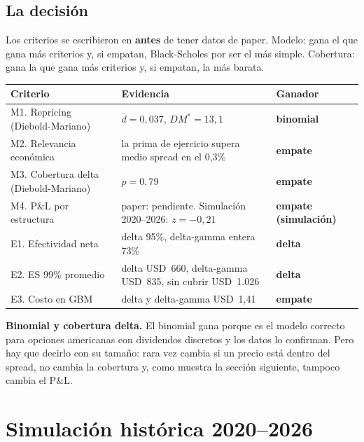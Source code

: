 \documentclass[11pt,a4paper]{article}
\newcommand{\code}[1]{\texttt{\detokenize{#1}}}
\newcommand{\usd}[1]{USD~#1}
\begin{document}
\subsection{La decisión}

Los criterios se escribieron en \code{scripts/scorecard.py} \textbf{antes} de tener datos de paper. Modelo: gana el
que gana más criterios y, si empatan, Black-Scholes por ser el más simple. Cobertura: gana la que gana más
criterios y, si empatan, la más barata.

\begin{center}
\small
\begin{tabularx}{\linewidth}{@{}>{\sffamily}lX>{\sffamily\bfseries}l@{}}
\toprule
\textbf{Criterio} & \textbf{Evidencia} & \textbf{Ganador} \\
\midrule
M1. Repricing (Diebold-Mariano) & $\bar d = 0{,}037$, $DM^* = 13{,}1$ & \textcolor{crr}{binomial} \\
M2. Relevancia económica & la prima de ejercicio supera medio spread en el 0,3\% & empate \\
M3. Cobertura delta (Diebold-Mariano) & $p = 0{,}79$ & empate \\
M4. P\&L por estructura & paper: pendiente. Simulación 2020–2026: $z=-0{,}21$ & empate (simulación) \\
\midrule
E1. Efectividad neta & delta 95\%, delta-gamma entera 73\% & \textcolor{aqua!70!black}{delta} \\
E2. ES 99\% promedio & delta \usd{660}, delta-gamma \usd{835}, sin cubrir \usd{1.026} & \textcolor{aqua!70!black}{delta} \\
E3. Costo en GBM & delta y delta-gamma \usd{1,41} & empate \\
\bottomrule
\end{tabularx}
\end{center}

\begin{idea}[Resultado]
\textbf{Binomial y cobertura delta.} El binomial gana porque es el modelo correcto para opciones americanas con
dividendos discretos y los datos lo confirman. Pero hay que decirlo con su tamaño: rara vez cambia si un precio está
dentro del spread, no cambia la cobertura y, como muestra la sección siguiente, tampoco cambia el P\&L.
\end{idea}

\newpage
\section{Simulación histórica 2020–2026}
\end{document}
